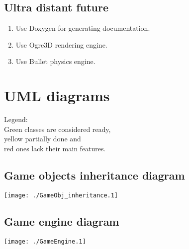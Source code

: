 \documentclass[11pt,a4paper,oneside]{report}
\begin{document}
\section{Ultra distant future}
\begin{enumerate}
	\item Use Doxygen for generating documentation.
	\item Use Ogre3D rendering engine.
	\item Use Bullet physics engine.
\end{enumerate}

\chapter{UML diagrams}
Legend:
\\\colorbox{gr}{Green} classes are considered ready, 
\\\colorbox{ye}{yellow} partially done and 
\\\colorbox{re}{red} ones lack their main features.

\section{Game objects inheritance diagram}

\texttt{[image: ./GameObj\_inheritance.1]}

\section{Game engine diagram}
\texttt{[image: ./GameEngine.1]}

	
\end{document}
